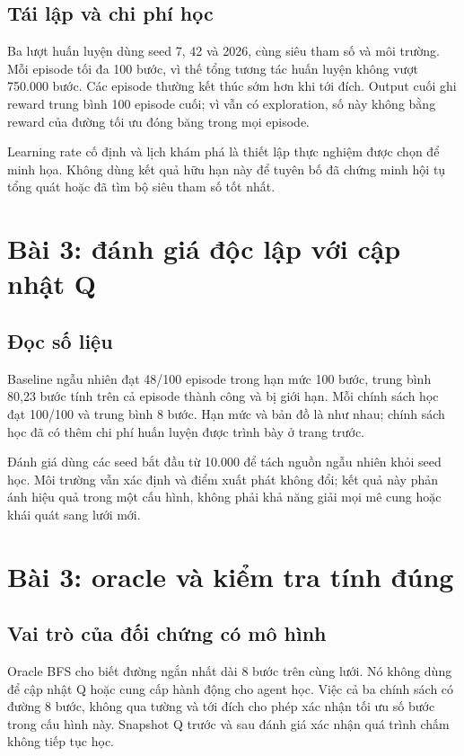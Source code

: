 \subsection{Tái lập và chi phí học}
Ba lượt huấn luyện dùng seed 7, 42 và 2026, cùng siêu tham số và môi trường. Mỗi
episode tối đa 100 bước, vì thế tổng tương tác huấn luyện không vượt 750.000 bước.
Các episode thường kết thúc sớm hơn khi tới đích. Output cuối ghi reward trung bình
100 episode cuối; vì vẫn có exploration, số này không bằng reward của đường tối ưu
đóng băng trong mọi episode.

Learning rate cố định và lịch khám phá là thiết lập thực nghiệm được chọn để minh
họa. Không dùng kết quả hữu hạn này để tuyên bố đã chứng minh hội tụ tổng quát hoặc
đã tìm bộ siêu tham số tốt nhất.

\newpage
\section*{Bài 3: đánh giá độc lập với cập nhật Q}

\subsection{Đọc số liệu}
Baseline ngẫu nhiên đạt 48/100 episode trong hạn mức 100 bước, trung bình 80,23 bước
tính trên cả episode thành công và bị giới hạn. Mỗi chính sách học đạt 100/100 và
trung bình 8 bước. Hạn mức và bản đồ là như nhau; chính sách học đã có thêm chi phí
huấn luyện được trình bày ở trang trước.

Đánh giá dùng các seed bắt đầu từ 10.000 để tách nguồn ngẫu nhiên khỏi seed học.
Môi trường vẫn xác định và điểm xuất phát không đổi; kết quả này phản ánh hiệu quả
trong một cấu hình, không phải khả năng giải mọi mê cung hoặc khái quát sang lưới mới.

\newpage
\section*{Bài 3: oracle và kiểm tra tính đúng}

\subsection{Vai trò của đối chứng có mô hình}
Oracle BFS cho biết đường ngắn nhất dài 8 bước trên cùng lưới. Nó không dùng để
cập nhật Q hoặc cung cấp hành động cho agent học. Việc cả ba chính sách có đường
8 bước, không qua tường và tới đích cho phép xác nhận tối ưu số bước trong cấu hình
này. Snapshot Q trước và sau đánh giá xác nhận quá trình chấm không tiếp tục học.

